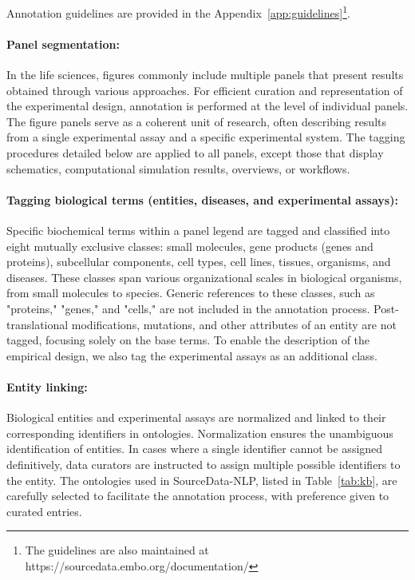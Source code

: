 \documentclass{bioinfo}
\begin{document}
\begin{methods}
Annotation guidelines are provided in the Appendix~\ref{app:guidelines}\footnote{The
guidelines are also maintained at https://sourcedata.embo.org/documentation/}.

\paragraph{Panel segmentation:} 
In the life sciences, figures commonly include multiple panels that present results obtained through various approaches. For efficient curation and representation of the experimental design, annotation is performed at the level of individual panels. The figure panels serve as a coherent unit of research, often describing results from a single experimental assay and a specific experimental system. The tagging procedures detailed below are applied to all panels, except those that display schematics, computational simulation results, overviews, or workflows.

\paragraph{Tagging biological terms (entities, diseases, and experimental assays):}
Specific biochemical terms within a panel legend are tagged and classified into eight mutually exclusive classes: small molecules, gene products (genes and proteins), subcellular components, cell types, cell lines, tissues, organisms, and diseases. These classes span various organizational scales in biological organisms, from small molecules to species. Generic references to these classes, such as "proteins," "genes," and "cells," are not included in the annotation process. Post-translational modifications, mutations, and other attributes of an entity are not tagged, focusing solely on the base terms. To enable the description of the empirical design, we also tag the experimental assays as an additional class.

\paragraph{Entity linking:} 
Biological entities and experimental assays are normalized and linked to their corresponding identifiers in ontologies. Normalization ensures the unambiguous identification of entities. In cases where a single identifier cannot be assigned definitively, data curators are instructed to assign multiple possible identifiers to the entity. The ontologies used in SourceData-NLP, listed in Table~\ref{tab:kb}, are carefully selected to facilitate the annotation process, with preference given to curated entries.


\end{methods}
\end{document}
